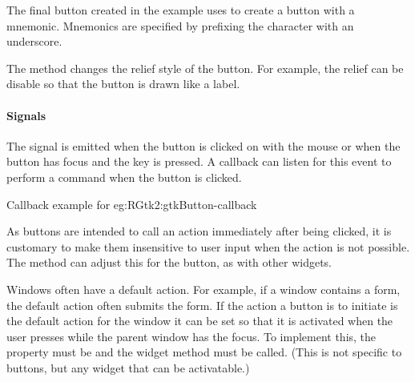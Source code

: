 The final button created in the example uses
 to create a button with a
mnemonic. Mnemonics are specified by prefixing the character with an
underscore.

The method  changes the relief style of
the button. For example, the relief can be disable so that the button
is drawn like a label.

\paragraph{Signals}

The  signal is emitted when the button is
clicked on with the mouse or when the button has focus and the
 key is pressed. A callback can listen for this event to
perform a command when the button is clicked.  

\begin{example}{Callback example for
    }{eg:RGtk2:gtkButton-callback}

\begin{Schunk}
\end{Schunk}
\end{example}

As buttons are intended to call an action immediately after being
clicked, it is customary to make them insensitive to user input when
the action is not possible. The 
method can adjust this for the button, as with other widgets.

Windows often have a default action. For example, if a window contains
a form, the default action often submits the form. If the action a
button is to initiate is the default action for the window it can be
set so that it is activated when the user presses  while
the parent window has the focus. To implement this, the property
 must be  and the widget method
 must be called. (This is not specific
to buttons, but any widget that can be activatable.)

